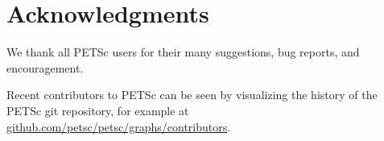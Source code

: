 %
%
\chapter{Acknowledgments}

\medskip \medskip \noindent
We thank all PETSc users for their many suggestions, bug reports, and
encouragement.

\vspace{.2in}

\noindent
Recent contributors to PETSc can be seen by visualizing the history of the PETSc git repository, for example at
\href{https://github.com/petsc/petsc/graphs/contributors}{github.com/petsc/petsc/graphs/contributors}.

\vspace{.2in}

